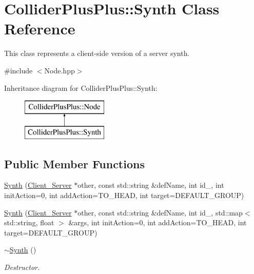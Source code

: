 \hypertarget{classColliderPlusPlus_1_1Synth}{\section{Collider\-Plus\-Plus\-:\-:Synth Class Reference}
\label{classColliderPlusPlus_1_1Synth}
}


This class represents a client-\/side version of a server synth.  




{\ttfamily \#include $<$Node.\-hpp$>$}

Inheritance diagram for Collider\-Plus\-Plus\-:\-:Synth\-:\begin{figure}[H]
\begin{center}
\leavevmode
\includegraphics[height=2.000000cm]{classColliderPlusPlus_1_1Synth}
\end{center}
\end{figure}
\subsection*{Public Member Functions}
\begin{DoxyCompactItemize}
\item 
\hyperlink{classColliderPlusPlus_1_1Synth_a95d3df49d21a4c6844089ae7641a1be4}{Synth} (\hyperlink{classColliderPlusPlus_1_1Client__Server}{Client\-\_\-\-Server} $\ast$other, const std\-::string \&def\-Name, int id\-\_\-, int init\-Action=0, int add\-Action=T\-O\-\_\-\-H\-E\-A\-D, int target=D\-E\-F\-A\-U\-L\-T\-\_\-\-G\-R\-O\-U\-P)
\item 
\hyperlink{classColliderPlusPlus_1_1Synth_a6b1104ec5673c05ebe9d7804a1d85af8}{Synth} (\hyperlink{classColliderPlusPlus_1_1Client__Server}{Client\-\_\-\-Server} $\ast$other, const std\-::string \&def\-Name, int id\-\_\-, std\-::map$<$ std\-::string, float $>$ \&args, int init\-Action=0, int add\-Action=T\-O\-\_\-\-H\-E\-A\-D, int target=D\-E\-F\-A\-U\-L\-T\-\_\-\-G\-R\-O\-U\-P)
\item 
\hypertarget{classColliderPlusPlus_1_1Synth_a1fb61bf548db414b4dc543eac83216ae}{\hyperlink{classColliderPlusPlus_1_1Synth_a1fb61bf548db414b4dc543eac83216ae}{$\sim$\-Synth} ()}\label{classColliderPlusPlus_1_1Synth_a1fb61bf548db414b4dc543eac83216ae}

\begin{DoxyCompactList}\small\item\em Destructor. \end{DoxyCompactList}\end{DoxyCompactItemize}


